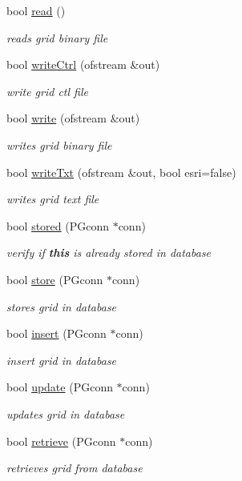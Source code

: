 \begin{DoxyCompactItemize}
bool \hyperlink{classfwi_1_1grid_1_1Grid_aafc829b90cb1a0dc6ec9daf425f6b8b7}{read} ()
\begin{DoxyCompactList}\small\item\em reads grid binary file \end{DoxyCompactList}\item 
bool \hyperlink{classfwi_1_1grid_1_1Grid_a115667cd2987c5972d7fa28d0f07a008}{write\-Ctrl} (ofstream \&out)
\begin{DoxyCompactList}\small\item\em write grid ctl file \end{DoxyCompactList}\item 
bool \hyperlink{classfwi_1_1grid_1_1Grid_a3288da25df63b739516c2bf90f9131fa}{write} (ofstream \&out)
\begin{DoxyCompactList}\small\item\em writes grid binary file \end{DoxyCompactList}\item 
bool \hyperlink{classfwi_1_1grid_1_1Grid_a0f7797bf1413a6082559ce7d4561ecbc}{write\-Txt} (ofstream \&out, bool esri=false)
\begin{DoxyCompactList}\small\item\em writes grid text file \end{DoxyCompactList}\item 
bool \hyperlink{classfwi_1_1grid_1_1Grid_ac3ac1ccceb7696f022d39ca4e99e5b92}{stored} (P\-Gconn $\ast$conn)
\begin{DoxyCompactList}\small\item\em verify if {\bfseries this} is already stored in database \end{DoxyCompactList}\item 
bool \hyperlink{classfwi_1_1grid_1_1Grid_ad440bf48610e89a053d5d1a32a28579a}{store} (P\-Gconn $\ast$conn)
\begin{DoxyCompactList}\small\item\em stores grid in database \end{DoxyCompactList}\item 
bool \hyperlink{classfwi_1_1grid_1_1Grid_a65a165655dd630f5f1b7c52b4e261059}{insert} (P\-Gconn $\ast$conn)
\begin{DoxyCompactList}\small\item\em insert grid in database \end{DoxyCompactList}\item 
bool \hyperlink{classfwi_1_1grid_1_1Grid_ac255d83afc8e784761cb2d46775612ee}{update} (P\-Gconn $\ast$conn)
\begin{DoxyCompactList}\small\item\em updates grid in database \end{DoxyCompactList}\item 
bool \hyperlink{classfwi_1_1grid_1_1Grid_a653fc4a3630fbcfc92229b42fea9ab77}{retrieve} (P\-Gconn $\ast$conn)
\begin{DoxyCompactList}\small\item\em retrieves grid from database \end{DoxyCompactList}\end{DoxyCompactItemize}
